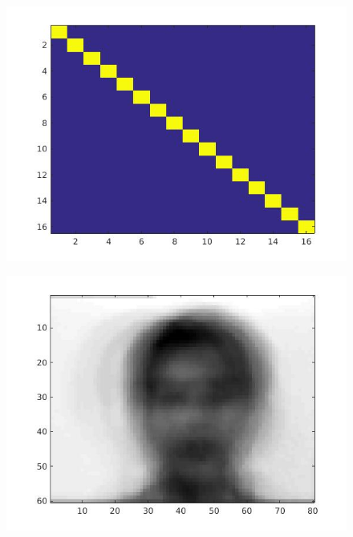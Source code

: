 \documentclass{article}
\begin{document}
\begin{figure}[H]

\includegraphics[scale =.5]{report5_1}
\end{figure}


\begin{figure}[H]


\includegraphics[scale =.5]{report6_1}
\end{figure}
\end{document}
